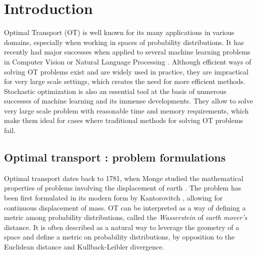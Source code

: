 \section{Introduction}
Optimal Transport (OT) is well known for its many applications in various domains, especially when working in spaces of probability distributions. It has recently had major successes when applied to several machine learning problems in Computer Vision \cite{arjovsky_wasserstein_2017, rubner_earth_2000} or Natural Language Processing \cite{kusner_word_2015}. Although efficient ways of solving OT problems exist and are widely used in practice, they are impractical for very large scale settings, which creates the need for more efficient methods. 
Stochastic optimization is also an essential tool at the basis of numerous successes of machine learning and its immense developments. They allow to solve very large scale problem with reasonable time and memory requirements, which make them ideal for cases where traditional methods for solving OT problems fail. 

\subsection{Optimal transport : problem formulations}

Optimal transport dates back to 1781, when Monge studied the mathematical properties of problems involving the displacement of earth \cite{monge1781}. The problem has been first formulated in its modern form by Kantorovitch \cite{kantorovitch_on_1942}, allowing for continuous displacement of mass. OT can be interpreted as a way of defining a metric among probability distributions, called the \emph{Wasserstein} of \emph{earth mover's} distance. It is often described as a natural way to leverage the geometry of a space and define a metric on probability distributions, by opposition to the Euclidean distance and Kullback-Leibler divergence. 

